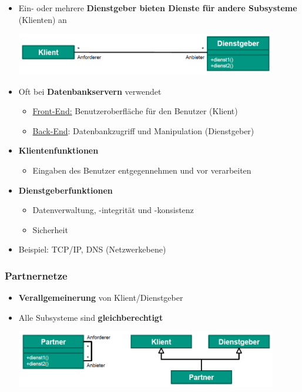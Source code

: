 			\begin{itemize}
				\item Ein- oder mehrere \textbf{Dienstgeber bieten Dienste für andere Subsysteme} (Klienten) an
				\begin{center}
					\includegraphics[width=0.9\textwidth]{../resources/images/klientDienstgeber.png}
				\end{center}
				\item Oft bei \textbf{Datenbankservern} verwendet
				\begin{itemize}
					\item \underline{Front-End:} Benutzeroberfläche für den Benutzer (Klient)
					\item \underline{Back-End}: Datenbankzugriff und Manipulation (Dienstgeber)
				\end{itemize}
				\item \textbf{Klientenfunktionen}
				\begin{itemize}
					\item Eingaben des Benutzer entgegennehmen und vor verarbeiten
				\end{itemize}
				\item \textbf{Dienstgeberfunktionen}
				\begin{itemize}
					\item Datenverwaltung, -integrität und -konsistenz
					\item Sicherheit
				\end{itemize}		
				\item Beispiel: TCP/IP, DNS (Netzwerkebene)		
			\end{itemize}	
			
		\subsubsection{Partnernetze}
					
			\begin{itemize}
				\item \textbf{Verallgemeinerung} von Klient/Dienstgeber
				\item Alle Subsysteme sind \textbf{gleichberechtigt}
				\begin{center}
					\includegraphics[width=0.9\textwidth]{../resources/images/partnernetze.png}
				\end{center}
			\end{itemize}
					
